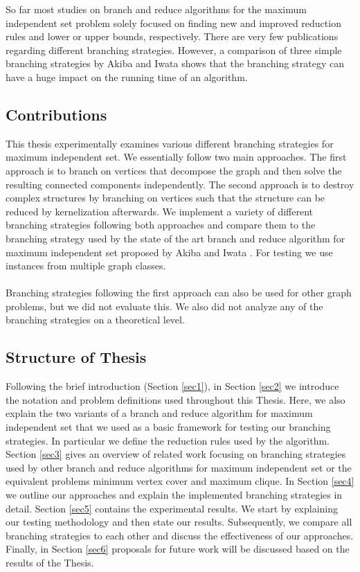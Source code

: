 \documentclass[]{article}
\begin{document}
So far most studies on branch and reduce algorithms for the maximum independent set problem solely focused on finding new and improved reduction rules and lower or upper bounds, respectively. There are very few publications regarding different branching strategies. However, a comparison of three simple branching strategies by Akiba and Iwata \cite{AkibaIwata} shows that the branching strategy can have a huge impact on the running time of an algorithm.

\subsection{Contributions}

This thesis experimentally examines various different branching strategies for maximum independent set. We essentially follow two main approaches. The first approach is to branch on vertices that decompose the graph and then solve the resulting connected components independently. The second approach is to destroy complex structures by branching on vertices such that the structure can be reduced by kernelization afterwards. We implement a variety of different branching strategies following both approaches and compare them to the branching strategy used by the state of the art branch and reduce algorithm for maximum independent set proposed by Akiba and Iwata \cite{AkibaIwata}. For testing we use instances from multiple graph classes.\paragraph{}
Branching strategies following the first approach can also be used for other graph problems, but we did not evaluate this. We also did not analyze any of the branching strategies on a theoretical level.  



\subsection{Structure of Thesis}

Following the brief introduction (Section \ref{sec1}), in Section \ref{sec2} we introduce the notation and problem definitions used throughout this Thesis. Here, we also explain the two variants of a branch and reduce algorithm for maximum independent set that we used as a basic framework for testing our branching strategies. In particular we define the reduction rules used by the algorithm.\\
Section \ref{sec3} gives an overview of related work focusing on branching strategies used by other branch and reduce algorithms for maximum independent set or the equivalent problems minimum vertex cover and maximum clique.
In Section \ref{sec4} we outline our approaches and explain the implemented branching strategies in detail. Section \ref{sec5} contains the experimental results. We start by explaining our testing methodology and then state our results. Subsequently, we compare all branching strategies to each other and discuss the effectiveness of our approaches. Finally, in Section \ref{sec6} proposals for future work will be discussed based on the results of the Thesis.
\end{document}
